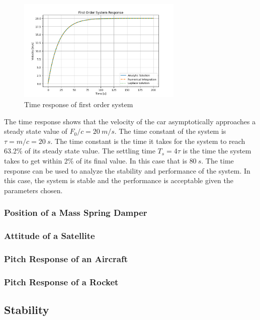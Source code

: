 \begin{figure}[H]
    \centering
    \includegraphics[width=0.7\textwidth]{Figures/first_order_response.png}
    \caption{Time response of first order system}
    \label{f:first_order_response}
\end{figure}
\noindent The time response shows that the velocity of the car asymptotically approaches a steady state value of $F_0/c = 20~m/s$. The time constant of the system is $\tau = m/c = 20~s$. The time constant is the time it takes for the system to reach 63.2\% of its steady state value. The settling time $T_s=4\tau$ is the time the system takes to get within 2\% of its final value. In this case that is $80~s$. The time response can be used to analyze the stability and performance of the system. In this case, the system is stable and the performance is acceptable given the parameters chosen. 

\subsubsection{Position of a Mass Spring Damper}

\subsubsection{Attitude of a Satellite}

\subsubsection{Pitch Response of an Aircraft}

\subsubsection{Pitch Response of a Rocket}

\subsection{Stability}

